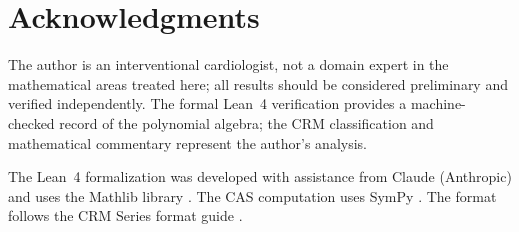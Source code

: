 \documentclass[11pt]{article}
\theoremstyle{plain}
\theoremstyle{definition}
\theoremstyle{remark}
\begin{document}
\section*{Acknowledgments}

The author is an interventional cardiologist, not a domain expert in the mathematical areas treated here; all results should be considered preliminary and verified independently. The formal Lean~4 verification provides a machine-checked record of the polynomial algebra; the CRM classification and mathematical commentary represent the author's analysis.

The Lean~4 formalization was developed with assistance from Claude (Anthropic) and uses the Mathlib library \cite{mathlib}. The CAS computation uses SymPy \cite{sympy}. The format follows the CRM Series format guide \cite{format-guide}.
\end{document}
